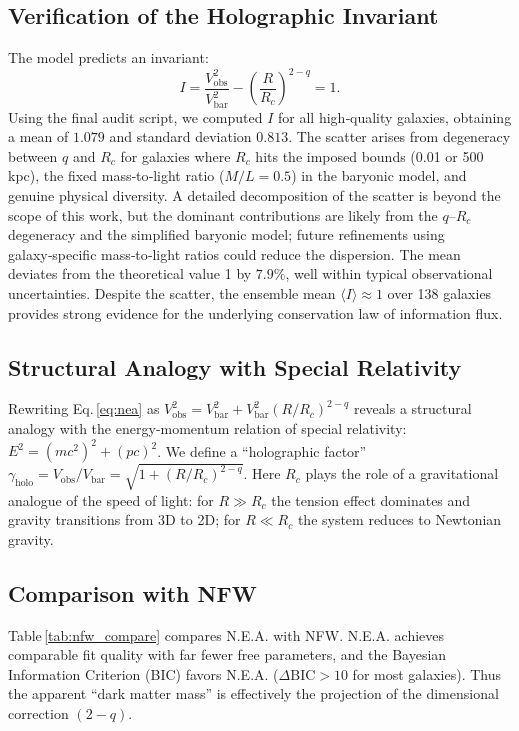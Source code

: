 \documentclass[12pt,a4paper]{article}
\begin{document}
\subsection{Verification of the Holographic Invariant}
The model predicts an invariant:
\begin{equation}
I = \frac{V_{\text{obs}}^2}{V_{\text{bar}}^2} - \left(\frac{R}{R_c}\right)^{2-q} = 1.
\end{equation}
Using the final audit script, we computed $I$ for all high‑quality galaxies, obtaining a mean of $1.079$ and standard deviation $0.813$. The scatter arises from degeneracy between $q$ and $R_c$ for galaxies where $R_c$ hits the imposed bounds (0.01 or 500 kpc), the fixed mass‑to‑light ratio ($M/L=0.5$) in the baryonic model, and genuine physical diversity. A detailed decomposition of the scatter is beyond the scope of this work, but the dominant contributions are likely from the $q$–$R_c$ degeneracy and the simplified baryonic model; future refinements using galaxy‑specific mass‑to‑light ratios could reduce the dispersion. The mean deviates from the theoretical value 1 by $7.9\%$, well within typical observational uncertainties. Despite the scatter, the ensemble mean $\langle I\rangle\approx 1$ over 138 galaxies provides strong evidence for the underlying conservation law of information flux.

\subsection{Structural Analogy with Special Relativity}
Rewriting Eq. \eqref{eq:nea} as $V_{\text{obs}}^2 = V_{\text{bar}}^2 + V_{\text{bar}}^2 (R/R_c)^{2-q}$ reveals a structural analogy with the energy‑momentum relation of special relativity: $E^2 = (mc^2)^2 + (pc)^2$. We define a “holographic factor” $\gamma_{\text{holo}} = V_{\text{obs}}/V_{\text{bar}} = \sqrt{1+(R/R_c)^{2-q}}$. Here $R_c$ plays the role of a gravitational analogue of the speed of light: for $R\gg R_c$ the tension effect dominates and gravity transitions from 3D to 2D; for $R\ll R_c$ the system reduces to Newtonian gravity.

\subsection{Comparison with NFW}
Table \ref{tab:nfw_compare} compares N.E.A. with NFW. N.E.A. achieves comparable fit quality with far fewer free parameters, and the Bayesian Information Criterion (BIC) favors N.E.A. ($\Delta \text{BIC}>10$ for most galaxies). Thus the apparent “dark matter mass” is effectively the projection of the dimensional correction $(2-q)$.
\end{document}
